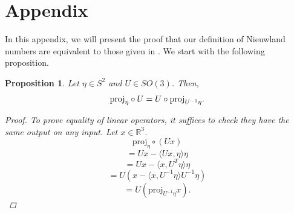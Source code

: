 \documentclass[a4paper]{amsart}
\newtheorem{prop}[thm]{Proposition}
\theoremstyle{remark}
\begin{document}
\section{Appendix}\label{sec:appendix}

In this appendix, we will present the proof that our definition of Nieuwland numbers are equivalent to those given in \cite{StYu23}. We start with the following proposition.
\\
\begin{prop}
Let $\eta\in S^2$ and $U\in SO(3)$. Then, $$\textup{proj}_\eta\circ U=U\circ \textup{proj}_{U^{-1}\eta}.$$
\begin{proof}
    To prove equality of linear operators, it suffices to check they have the same output on any input. Let $x\in\mathbb{R}^3$.
    $$\textrm{proj}_\eta\circ(Ux)$$
    $$=Ux-\langle Ux,\eta\rangle\eta$$
    $$=Ux-\langle x,U^T\eta\rangle\eta$$
    $$=U(x-\langle x,U^{-1}\eta\rangle U^{-1}\eta)$$
    $$=U(\textrm{proj}_{U^{-1}\eta}x).$$
\end{proof}
\end{prop}
\end{document}

